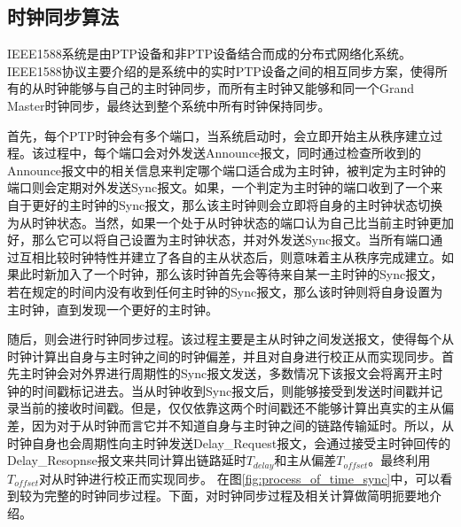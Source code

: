 
\subsection{时钟同步算法}
IEEE1588系统是由PTP设备和非PTP设备结合而成的分布式网络化系统。IEEE1588协议主要介绍的是系统中的实时PTP设备之间的相互同步方案，使得所有的从时钟能够与自己的主时钟同步，而所有主时钟又能够和同一个Grand Master时钟同步，最终达到整个系统中所有时钟保持同步。

首先，每个PTP时钟会有多个端口，当系统启动时，会立即开始主从秩序建立过程。该过程中，每个端口会对外发送Announce报文，同时通过检查所收到的Announce报文中的相关信息来判定哪个端口适合成为主时钟，被判定为主时钟的端口则会定期对外发送Sync报文。如果，一个判定为主时钟的端口收到了一个来自于更好的主时钟的Sync报文，那么该主时钟则会立即将自身的主时钟状态切换为从时钟状态。当然，如果一个处于从时钟状态的端口认为自己比当前主时钟更加好，那么它可以将自己设置为主时钟状态，并对外发送Sync报文。当所有端口通过互相比较时钟特性并建立了各自的主从状态后，则意味着主从秩序完成建立。如果此时新加入了一个时钟，那么该时钟首先会等待来自某一主时钟的Sync报文，若在规定的时间内没有收到任何主时钟的Sync报文，那么该时钟则将自身设置为主时钟，直到发现一个更好的主时钟。

随后，则会进行时钟同步过程。该过程主要是主从时钟之间发送报文，使得每个从时钟计算出自身与主时钟之间的时钟偏差，并且对自身进行校正从而实现同步。首先主时钟会对外界进行周期性的Sync报文发送，多数情况下该报文会将离开主时钟的时间戳标记进去。当从时钟收到Sync报文后，则能够接受到发送时间戳并记录当前的接收时间戳。但是，仅仅依靠这两个时间戳还不能够计算出真实的主从偏差，因为对于从时钟而言它并不知道自身与主时钟之间的链路传输延时。所以，从时钟自身也会周期性向主时钟发送Delay\_Request报文，会通过接受主时钟回传的Delay\_Resopnse报文来共同计算出链路延时$T_{delay}$和主从偏差$T_{offset}$。最终利用$T_{offset}$对从时钟进行校正而实现同步。
\label{sec:1588_theory_sync}
在图\ref{fig:process_of_time_sync}中，可以看到较为完整的时钟同步过程。下面，对时钟同步过程及相关计算做简明扼要地介绍。

